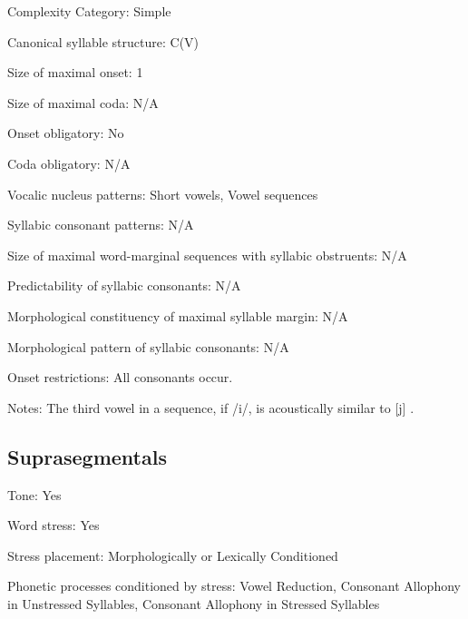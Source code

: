 {\begin{appendixdesc}
\item[Complexity Category:] Simple

\item[Canonical syllable structure:] C(V) \citep[163--167]{Chacon2012}

\item[Size of maximal onset:] 1

\item[Size of maximal coda:] N/A

\item[Onset obligatory:] No

\item[Coda obligatory:] N/A

\item[Vocalic nucleus patterns:] Short vowels, Vowel sequences

\item[Syllabic consonant patterns:] N/A

\item[Size of maximal word-marginal sequences with syllabic obstruents:] N/A

\item[Predictability of syllabic consonants:] N/A

\item[Morphological constituency of maximal syllable margin:] N/A

\item[Morphological pattern of syllabic consonants:] N/A

\item[Onset restrictions:] All consonants occur.

\item[Notes:] The third vowel in a sequence, if /i/, is acoustically similar to [j] \citep[52]{Chacon2012}.
\end{appendixdesc}
\subsection*{Suprasegmentals}
\begin{appendixdesc}
\item[Tone:] Yes

\item[Word stress:] Yes

\item[Stress placement:] Morphologically or Lexically Conditioned

\item[Phonetic processes conditioned by stress:] Vowel Reduction, Consonant Allophony in Unstressed Syllables, Consonant Allophony in Stressed Syllables


\end{appendixdesc}}
